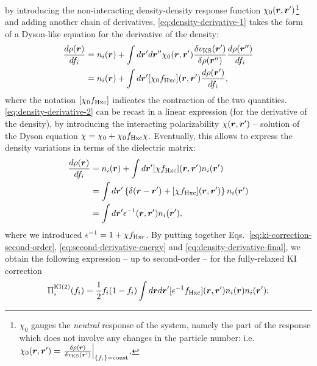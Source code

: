 %
by introducing the non-interacting density-density response function $\chi_0({\bm r},{\bm r}')$\footnote{$\chi_0$ gauges the \emph{neutral} response of the system, namely the part of the response which does not involve any changes in the particle number: i.e. $\chi_0({\bm r},{\bm r}') = \left. \frac{\delta\rho({\bm r})}{\delta v_{\rm KS}({\bm r}')} \right|_{\{ f_i \} = {\rm const}}$.} and adding another chain of derivatives, \cref{eq:density-derivative-1} takes the form of a Dyson-like equation for the derivative of the density:
%
\begin{equation}
    \begin{split}
    \frac{d\rho({\bm r})}{df_i} &= n_i({\bm r}) + \int d{\bm r}' d{\bm r}'' \chi_0({\bm r},{\bm r}') \frac{\delta v_{\rm KS}({\bm r}')}{\delta \rho({\bm r}'')} \frac{d\rho({\bm r}'')}{df_i} \\
    &= n_i({\bm r}) + \int d{\bm r}' [\chi_0 f_{\rm Hxc}]({\bm r},{\bm r}') \frac{d\rho({\bm r}')}{df_i} ,
    \end{split}
    \label{eq:density-derivative-2}
\end{equation}
%
where the notation $[\chi_0 f_{\rm Hxc}]$ indicates the contraction of the two quantities. \cref{eq:density-derivative-2} can be recast in a linear expression (for the derivative of the density), by introducing the interacting polarizability $\chi({\bm r},{\bm r}')$ -- solution of the Dyson equation $\chi = \chi_0 + \chi_0 f_{\rm Hxc} \chi$. Eventually, this allows to express the density variations in terms of the dielectric matrix:
%
\begin{equation}
    \begin{split}
    \frac{d\rho({\bm r})}{df_i} &= n_i({\bm r}) + \int d{\bm r}' [\chi f_{\rm Hxc}]({\bm r},{\bm r}') n_i({\bm r}') \\
    &= \int d{\bm r}' \left\{ \delta({\bm r}-{\bm r}') + [\chi f_{\rm Hxc}]({\bm r},{\bm r}') \right\} n_i({\bm r}') \\
    &= \int d{\bm r}' \epsilon^{-1}({\bm r},{\bm r}') n_i({\bm r}') ,
    \end{split}
    \label{eq:density-derivative-final}
\end{equation}
%
where we introduced $\epsilon^{-1} = 1 + \chi f_{\rm Hxc}$. By putting together Eqs.~\eqref{eq:ki-correction-second-order}, \eqref{eq:second-derivative-energy} and \eqref{eq:density-derivative-final}, we obtain the following expression -- up to second-order -- for the fully-relaxed KI correction
%
\begin{equation}
    \Pi_i^{\rm KI(2)}(f_i) = \frac{1}{2} f_i(1-f_i) \int d{\bm r} d{\bm r}' [\epsilon^{-1} f_{\rm Hxc}]({\bm r},{\bm r}') n_i({\bm r}) n_i({\bm r}') ;
    \label{eq:relaxed-ki-second-order}
\end{equation}
